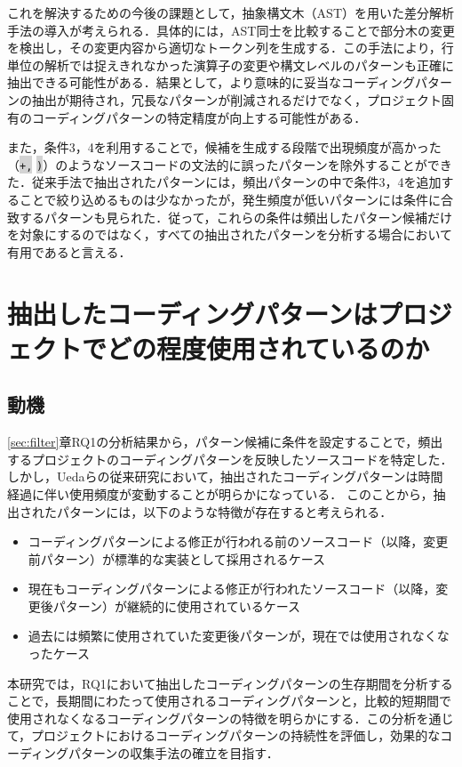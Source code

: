 \documentclass[11pt]{jreport}
\newcommand{\RQtwo}{抽出したコーディングパターンはプロジェクトでどの程度使用されているのか}
\begin{document}
これを解決するための今後の課題として，抽象構文木（AST）を用いた差分解析手法の導入が考えられる．具体的には，AST同士を比較することで部分木の変更を検出し，その変更内容から適切なトークン列を生成する．この手法により，行単位の解析では捉えきれなかった演算子の変更や構文レベルのパターンも正確に抽出できる可能性がある．結果として，より意味的に妥当なコーディングパターンの抽出が期待され，冗長なパターンが削減されるだけでなく，プロジェクト固有のコーディングパターンの特定精度が向上する可能性がある．

また，条件3，4を利用することで，候補を生成する段階で出現頻度が高かった（\colorbox{lightgray}{\texttt{+,}} \colorbox{lightgray}{\texttt{)}}）のようなソースコードの文法的に誤ったパターンを除外することができた．従来手法で抽出されたパターンには，頻出パターンの中で条件3，4を追加することで絞り込めるものは少なかったが，発生頻度が低いパターンには条件に合致するパターンも見られた．従って，これらの条件は頻出したパターン候補だけを対象にするのではなく，すべての抽出されたパターンを分析する場合において有用であると言える．

\chapter{\RQtwo}\label{sec:time}
\section{動機}
\ref{sec:filter}章RQ1の分析結果から，パターン候補に条件を設定することで，頻出するプロジェクトのコーディングパターンを反映したソースコードを特定した．しかし，Uedaらの従来研究\cite{devreplay}において，抽出されたコーディングパターンは時間経過に伴い使用頻度が変動することが明らかになっている．
このことから，抽出されたパターンには，以下のような特徴が存在すると考えられる．
\begin{itemize}
    \item コーディングパターンによる修正が行われる前のソースコード（以降，変更前パターン）が標準的な実装として採用されるケース
    \item 現在もコーディングパターンによる修正が行われたソースコード（以降，変更後パターン）が継続的に使用されているケース
    \item 過去には頻繁に使用されていた変更後パターンが，現在では使用されなくなったケース
\end{itemize}
本研究では，RQ1において抽出したコーディングパターンの生存期間を分析することで，長期間にわたって使用されるコーディングパターンと，比較的短期間で使用されなくなるコーディングパターンの特徴を明らかにする．この分析を通じて，プロジェクトにおけるコーディングパターンの持続性を評価し，効果的なコーディングパターンの収集手法の確立を目指す．
\end{document}
